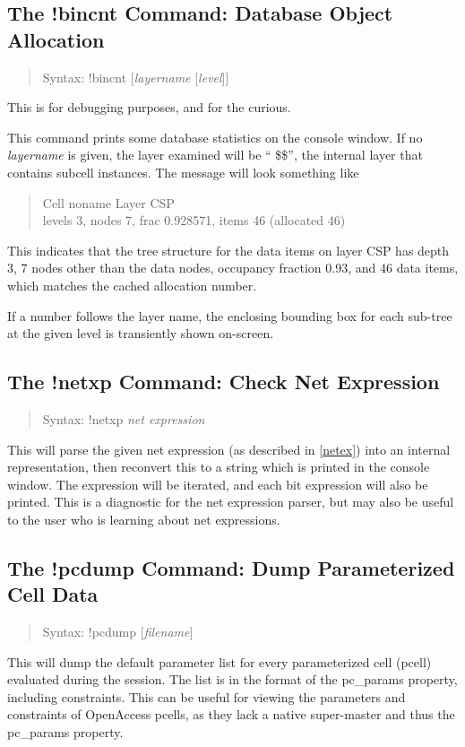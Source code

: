 \subsection{The {\cb !bincnt} Command: Database Object Allocation}
\begin{quote}
Syntax: {\vt !bincnt} [{\it layername} [{\it level\/}]]
\end{quote}
This is for debugging purposes, and for the curious.

This command prints some database statistics on the console window. 
If no {\it layername} is given, the layer examined will be ``{\vt
\$\$}'', the internal layer that contains subcell instances.  The
message will look something like
\begin{quote} \vt
Cell noname Layer CSP\\
levels 3, nodes 7, frac 0.928571, items 46 (allocated 46)
\end{quote}

This indicates that the tree structure for the data items on layer CSP
has depth 3, 7 nodes other than the data nodes, occupancy fraction
0.93, and 46 data items, which matches the cached allocation number.

If a number follows the layer name, the enclosing bounding box for
each sub-tree at the given level is transiently shown on-screen.


\subsection{The {\cb !netxp} Command: Check Net Expression}
\begin{quote}
Syntax: {\vt !netxp} {\it net expression}
\end{quote}
This will parse the given net expression (as described in \ref{netex})
into an internal representation, then reconvert this to a string which
is printed in the console window.  The expression will be iterated,
and each bit expression will also be printed.  This is a diagnostic
for the net expression parser, but may also be useful to the user who
is learning about net expressions.


\subsection{The {\cb !pcdump} Command: Dump Parameterized Cell Data}
\begin{quote}
Syntax: {\vt !pcdump} [{\it filename}]
\end{quote}
This will dump the default parameter list for every parameterized cell
(pcell) evaluated during the session.  The list is in the format of
the {\et pc\_params} property, including constraints.
This can be
useful for viewing the parameters and constraints of OpenAccess
pcells, as they lack a native super-master and thus the {\et
pc\_params} property.

